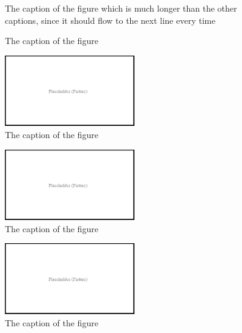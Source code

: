 \documentclass[12pt, oneside]{report}
\begin{document}
\begin{figure}[h]
  \centering
  \caption{The caption of the figure which is much longer than the other captions, since it should flow to the next line every time}
  \label{fig:BlockDiagram2}
\end{figure}

\begin{figure}[h]
  \centering
  \caption{The caption of the figure}
  \label{fig:BlockDiagram3}
\end{figure}

\begin{figure}[h]
  \centering
  \includegraphics[width=0.5\textwidth]{figures/pictures/placeholder}
  \caption{The caption of the figure}
  \label{fig:BlockDiagram4}
\end{figure}

\begin{figure}[h]
  \centering
  \includegraphics[width=0.5\textwidth]{figures/pictures/placeholder}
  \caption{The caption of the figure}
  \label{fig:BlockDiagram4}
\end{figure}

\begin{figure}[h]
  \centering
  \includegraphics[width=0.5\textwidth]{figures/pictures/placeholder}
  \caption{The caption of the figure}
  \label{fig:BlockDiagram4}
\end{figure}
\end{document}
